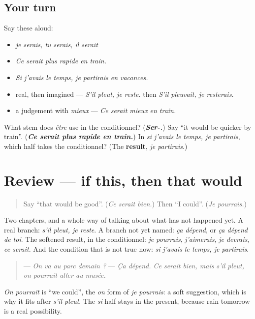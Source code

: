 \subsection*{Your turn}
Say these aloud:

\begin{itemize}
\raggedright
  \item \emph{je serais, tu serais, il serait}
  \item \emph{Ce serait plus rapide en train.}
  \item \emph{Si j'avais le temps, je partirais en vacances.}
  \item real, then imagined — \emph{S'il pleut, je reste.} then \emph{S'il pleuvait, je resterais.}
  \item a judgement with \emph{mieux} — \emph{Ce serait mieux en train.}
\end{itemize}

\begin{tcolorbox}[breakable,colback=teal!4,colframe=teal!35!black,title={Before you move on}]
What stem does \emph{être} use in the conditionnel? (\emph{\textbf{Ser-.}}) Say \textquotedblleft{}it would be quicker by train\textquotedblright{}. (\emph{\textbf{Ce serait plus rapide en train.}}) In \emph{si j'avais le temps, je partirais}, which half takes the conditionnel? (The \textbf{result}, \emph{je partirais}.)
\end{tcolorbox}
\section[(review)]{Review — if this, then that would}

\label{lesson:FR-C267-revision-conditionnel}



\begin{quote}
Say \textquotedblleft{}that would be good\textquotedblright{}. (\emph{Ce serait bien.}) Then \textquotedblleft{}I could\textquotedblright{}. (\emph{Je pourrais.})
\end{quote}

\begin{grammarlens}[title={What you've built}]
Two chapters, and a whole way of talking about what has not happened yet. A real branch: \emph{s'il pleut, je reste}. A branch not yet named: \emph{ça dépend}, or \emph{ça dépend de toi}. The softened result, in the conditionnel: \emph{je pourrais}, \emph{j'aimerais}, \emph{je devrais}, \emph{ce serait}. And the condition that is not true now: \emph{si j'avais le temps, je partirais}.

\begin{quote}
— \emph{On va au parc demain ?} — \emph{Ça dépend. Ce serait bien, mais s'il pleut, on pourrait aller au musée.}
\end{quote}

\emph{On pourrait} is \textquotedblleft{}we could\textquotedblright{}, the \emph{on} form of \emph{je pourrais}: a soft suggestion, which is why it fits after \emph{s'il pleut}. The \emph{si} half stays in the present, because rain tomorrow is a real possibility.
\end{grammarlens}

